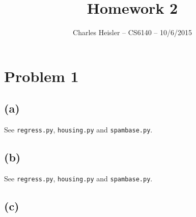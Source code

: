 \documentclass[12pt]{article}
\title{Homework 2}
\author{Charles Heisler -- CS6140 -- 10/6/2015}
\date{}
\begin{document}
\maketitle

\section*{Problem 1}

\subsection*{(a)}
See \texttt{regress.py}, \texttt{housing.py} and \texttt{spambase.py}.

\subsection*{(b)}
See \texttt{regress.py}, \texttt{housing.py} and \texttt{spambase.py}.

\subsection*{(c)}
\end{document}
